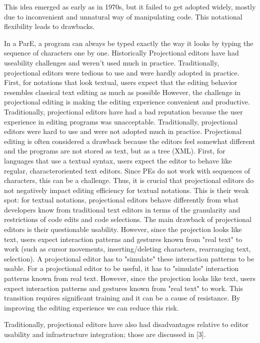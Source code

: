 This idea emerged as early as in 1970s, but it failed to get adopted widely, mostly due to inconvenient and unnatural way of manipulating code.
This notational flexibility leads to drawbacks.

In a ParE, a program can always be typed exactly the way it looks by typing the sequence of characters one by one.
Historically Projectional editors have had useability challenges and weren't used much in practice.  
Traditionally, projectional editors were tedious to use and were hardly adopted in practice.
First, for notations that look textual, users expect that the editing behavior resembles classical text editing as much as possible 
However, the challenge in projectional editing is making the editing experience convenient and productive.
Traditionally, projectional editors have had a bad reputation because the user experience in editing programs was unacceptable.
Traditionally, projectional editors were hard to use and were not adopted much in practice.
Projectional editing is often considered a drawback because the editors feel somewhat different and the programs are not stored as text, but as a tree (XML).
First, for languages that use a textual syntax, users expect the editor to behave like regular, characteroriented text editors.
Since PEs do not work with sequences of characters, this can be a challenge. 
Thus, it is crucial that projectional editors do not negatively impact editing efficiency for textual notations.
This is their weak spot: for textual notations, projectional editors behave differently from what developers know from traditional text editors in terms of the granularity and restrictions of code edits and code selections.
The main drawback of projectional editors is their questionable usability.
However, since the projection looks like text, users expect interaction patterns and gestures known from "real text" to work (such as cursor movements, inserting/deleting characters, rearranging text, selection).
A projectional editor has to "simulate" these interaction patterns to be usable. 
For a projectional editor to be useful, it has to "simulate" interaction patterns known from real text.
However, since the projection looks like text, users expect interaction patterns and gestures known from "real text" to work.
This transition requires significant training and it can be a cause of resistance.
By improving the editing experience we can reduce this risk.

Traditionally, projectional editors have also had disadvantages relative to editor usability and infrastructure integration; those are discussed in [3].

